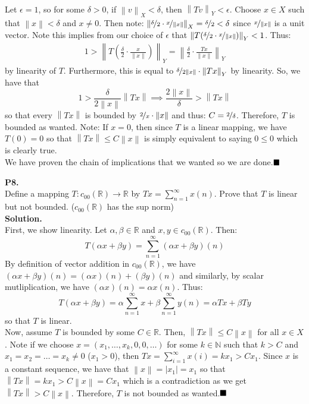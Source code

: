 \documentclass{article}
\newcommand{\norm}[1]{\left\lVert#1\right\rVert}
\begin{document}
    Let $\epsilon = 1$, so for some $\delta>0$, if $\norm{v}_X<\delta$, then $\norm{Tv}_Y<\epsilon$. Choose $x\in X$ such that
    $\norm{x}<\delta$ and $x\neq 0$. Then note: $\norm{\nicefrac{\delta}{2}\cdot\nicefrac{x}{\norm{x}}}_X=\nicefrac{\delta}{2}<
    \delta$ since $\nicefrac{x}{\norm{x}}$ is a unit vector. Note this implies from our choice of $\epsilon$ that
    $\norm{T(\nicefrac{\delta}{2}\cdot\nicefrac{x}{\norm{x}})}_Y < 1$. Thus:
    \begin{align*}
        1 > \norm{T(\frac{\delta}{2}\cdot\frac{x}{\norm{x}})}_Y = \norm{\frac{\delta}{2}\cdot\frac{Tx}{\norm{x}}}_Y
    \end{align*}
    by linearity of $T$. Furthermore, this is equal to $\nicefrac{\delta}{2\norm{x}}\cdot\norm{Tx}_Y$ by linearity. So, we have that
    \[ 1 > \frac{\delta}{2\norm{x}}\norm{Tx} \implies \frac{2\norm{x}}{\delta} > \norm{Tx} \]
    so that every $\norm{Tx}$ is bounded by $\nicefrac{2}{x}\cdot \norm{x}$ and thus: $C = \nicefrac{2}{\delta}$. Therefore, $T$
    is bounded as wanted. Note: If $x=0$, then since $T$ is a linear mapping, we have $T(0) = 0$ so that $\norm{Tx}\leq C\norm{x}$
    is simply equivalent to saying $0\leq 0$ which is clearly true.\\

    We have proven the chain of implications that we wanted so we are done.$\hfill\blacksquare$

    \newpage

    \textbf{P8.}\\

    Define a mapping $T: c_{00}(\mathbb{R}) \to \mathbb{R}$ by $Tx = \sum_{n=1}^{\infty} x(n)$. Prove that $T$ is linear but not
    bounded. ($c_{00}(\mathbb{R})$ has the sup norm)\\

    \textbf{Solution.}\\

    First, we show linearity. Let $\alpha,\beta\in\mathbb{R}$ and $x,y\in c_{00}(\mathbb{R})$. Then:
    \[ T(\alpha x + \beta y) = \sum_{n=1}^{\infty} (\alpha x + \beta y)(n) \]
    By definition of vector addition in $c_{00}(\mathbb{R})$, we have $(\alpha x + \beta y)(n) = (\alpha x)(n) + (\beta y)(n)$
    and similarly, by scalar mutliplication, we have $(\alpha x)(n) = \alpha x(n)$. Thus:
    \[ T(\alpha x + \beta y) = \alpha\sum_{n=1}^{\infty} x + \beta\sum_{n=1}^{\infty} y(n) = \alpha Tx + \beta Ty \]
    so that $T$ is linear.\\
    Now, assume $T$ is bounded by some $C\in\mathbb{R}$. Then, $\norm{Tx}\leq C\norm{x}$ for all $x\in X$. 
    Note if we choose $x = (x_1,\hdots,x_k,0,0,\hdots)$ for some $k\in\mathbb{N}$ such that $k>C$ and 
    $x_1=x_2=\hdots=x_k\neq 0$ ($x_1>0$), then $Tx = \sum_{i=1}^{\infty} x(i) = kx_1> Cx_1$. Since $x$ is a constant sequence,
    we have that $\norm{x} = |x_1| = x_1$ so that $\norm{Tx} = kx_1 > C\norm{x} = Cx_1$ which is a contradiction as we get
    $\norm{Tx} > C\norm{x}$. Therefore, $T$ is not bounded as wanted.$\hfill\blacksquare$\\
\end{document}

